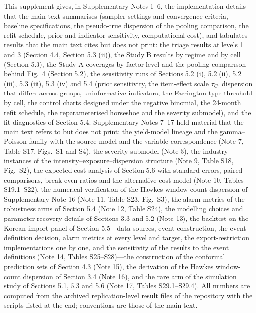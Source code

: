 \documentclass[10pt,a4paper]{article}
\begin{document}
This supplement gives, in Supplementary Notes 1--6, the implementation details that the main text summarises (sampler settings and convergence criteria, baseline specifications, the pseudo-true dispersion of the pooling comparison, the refit schedule, prior and indicator sensitivity, computational cost), and tabulates results that the main text cites but does not print: the triage results at levels 1 and 3 (Section 4.4, Section 5.3 (ii)), the Study B results by regime and by cell (Section 5.3), the Study A coverages by factor level and the pooling comparison behind Fig.~4 (Section 5.2), the sensitivity runs of Sections 5.2 (i), 5.2 (ii), 5.2 (iii), 5.3 (iii), 5.3 (iv) and 5.4 (prior sensitivity, the item-effect scale $\tau_C$, dispersion that differs across groups, uninformative indicators, the Farrington-type threshold by cell, the control charts designed under the negative binomial, the 24-month refit schedule, the reparameterised horseshoe and the severity submodel), and the fit diagnostics of Section 5.4. Supplementary Notes 7--17 hold material that the main text refers to but does not print: the yield-model lineage and the gamma--Poisson family with the source model and the variable correspondence (Note 7, Table S17, Figs.~S1 and S4), the severity submodel (Note 8), the industry instances of the intensity--exposure--dispersion structure (Note 9, Table S18, Fig.~S2), the expected-cost analysis of Section 5.6 with standard errors, paired comparisons, break-even ratios and the alternative cost model (Note 10, Tables S19.1--S22), the numerical verification of the Hawkes window-count dispersion of Supplementary Note 16 (Note 11, Table S23, Fig.~S3), the alarm metrics of the robustness arms of Section 5.4 (Note 12, Table S24), the modelling choices and parameter-recovery details of Sections 3.3 and 5.2 (Note 13), the backtest on the Korean import panel of Section 5.5---data sources, event construction, the event-definition decision, alarm metrics at every level and target, the export-restriction implementations one by one, and the sensitivity of the results to the event definitions (Note 14, Tables S25--S28)---the construction of the conformal prediction sets of Section 4.3 (Note 15), the derivation of the Hawkes window-count dispersion of Section 3.4 (Note 16), and the rare arm of the simulation study of Sections 5.1, 5.3 and 5.6 (Note 17, Tables S29.1--S29.4). All numbers are computed from the archived replication-level result files of the repository with the scripts listed at the end; conventions are those of the main text.
\end{document}
